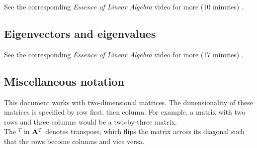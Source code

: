 See the corresponding \textit{Essence of Linear Algebra} video for more (10
minutes) \cite{bib:linalg_the_determinant}.

\subsection{Eigenvectors and eigenvalues}

See the corresponding \textit{Essence of Linear Algebra} video for more (17
minutes) \cite{bib:linalg_eigenvectors_and_eigenvalues}.

\subsection{Miscellaneous notation}

This document works with two-dimensional matrices. The dimensionality of these
matrices is specified by row first, then column. For example, a matrix with two
rows and three columns would be a two-by-three matrix. \\

The $^T$ in $\mathbf{A}^T$ denotes transpose, which flips the matrix across its
diagonal such that the rows become columns and vice versa.
